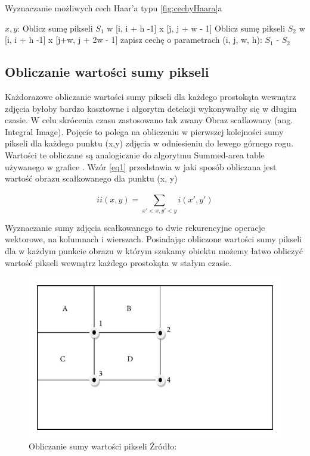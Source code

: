 \begin{algorithm}[H]
\caption{Wyznaczanie możliwych cech Haar'a typu \ref{fig:cechyHaara}a}
\label{alg:sumaPikseli}
\begin{algorithmic} 
\DontPrintSemicolon
\STATE $x, y$: 
\STATE Oblicz sumę pikseli ${S_{1}}$ w [i, i + h -1] x [j, j + w - 1]
\STATE Oblicz sumę pikseli $S_2$ w [i, i + h -1] x [j+w, j + 2w - 1]
\STATE zapisz cechę o parametrach (i, j, w, h): ${S_{1}}$ - ${S_{2}}$
\ENDFOR
\ENDFOR
\ENDFOR
\ENDFOR
\end{algorithmic}
\end{algorithm}

\subsection{Obliczanie wartości sumy pikseli}

Każdorazowe obliczanie wartości sumy pikseli dla każdego prostokąta wewnątrz zdjęcia byłoby bardzo kosztowne i algorytm detekcji wykonywałby się w długim czasie. W celu skrócenia czasu zastosowano tak zwany Obraz scałkowany (ang. Integral Image).
Pojęcie to polega na obliczeniu w pierwszej kolejności sumy pikseli dla każdego punktu (x,y) zdjęcia w odniesieniu do lewego górnego rogu. Wartości te obliczane są analogicznie do algorytmu Summed-area table używanego w grafice \cite{sumAreaTable}. Wzór \ref{eq1} przedstawia w jaki sposób obliczana jest wartość obrazu scałkowanego dla punktu (x, y)

\begin{equation} \label{eq1}
ii(x,y) = \sum_{x'<x, y'<y}^{} i(x', y')
\end{equation}

Wyznaczanie sumy zdjęcia scałkowanego to dwie rekurencyjne operacje wektorowe, na kolumnach i wierszach.
Posiadając obliczone wartości sumy pikseli dla w każdym punkcie obrazu w którym szukamy obiektu możemy łatwo obliczyć wartość pikseli wewnątrz każdego prostokąta w stałym czasie.

\begin{figure}[H]
\centering
\includegraphics[scale=1.4]{imgs/sumPixels.png}
\caption{Obliczanie sumy wartości pikseli Źródło: \cite{sumPixelsDoc}}
\label{fig:obrazScalkowany}
\end{figure}

